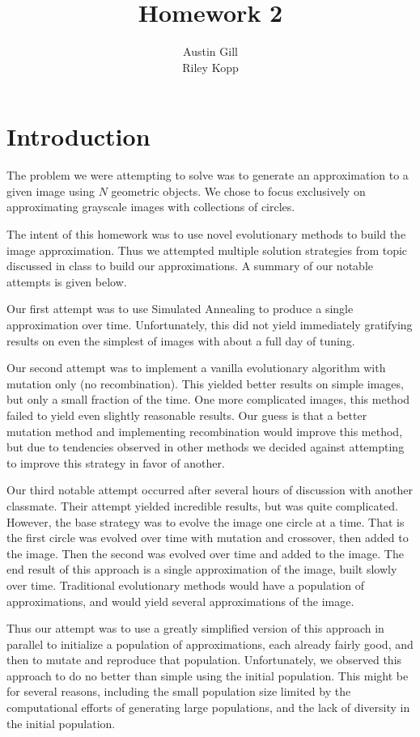 \documentclass{article}
\title{Homework 2}
\author{Austin Gill \\ Riley Kopp}
\begin{document}
\maketitle
\begingroup
\hypersetup{linkcolor=black}
\tableofcontents
\endgroup
\newpage

\section{Introduction}\label{sec:introduction}
    The problem we were attempting to solve was to generate an approximation to a given image using $N$ geometric objects. We chose to focus exclusively on approximating grayscale images with collections of circles.
    
    The intent of this homework was to use novel evolutionary methods to build the image approximation. Thus we attempted multiple solution strategies from topic discussed in class to build our approximations. A summary of our notable attempts is given below.
    
    Our first attempt was to use Simulated Annealing to produce a single approximation over time. Unfortunately, this did not yield immediately gratifying results on even the simplest of images with about a full day of tuning.
    
    Our second attempt was to implement a vanilla evolutionary algorithm with mutation only (no recombination). This yielded better results on simple images, but only a small fraction of the time. One more complicated images, this method failed to yield even slightly reasonable results. Our guess is that a better mutation method and implementing recombination would improve this method, but due to tendencies observed in other methods we decided against attempting to improve this strategy in favor of another.
    
    Our third notable attempt occurred after several hours of discussion with another classmate. Their attempt yielded incredible results, but was quite complicated. However, the base strategy was to evolve the image one circle at a time. That is the first circle was evolved over time with mutation and crossover, then added to the image. Then the second was evolved over time and added to the image. The end result of this approach is a single approximation of the image, built slowly over time. Traditional evolutionary methods would have a population of approximations, and would yield several approximations of the image.
    
    Thus our attempt was to use a greatly simplified version of this approach in parallel to initialize a population of approximations, each already fairly good, and then to mutate and reproduce that population. Unfortunately, we observed this approach to do no better than simple using the initial population. This might be for several reasons, including the small population size limited by the computational efforts of generating large populations, and the lack of diversity in the initial population.
    
\end{document}
